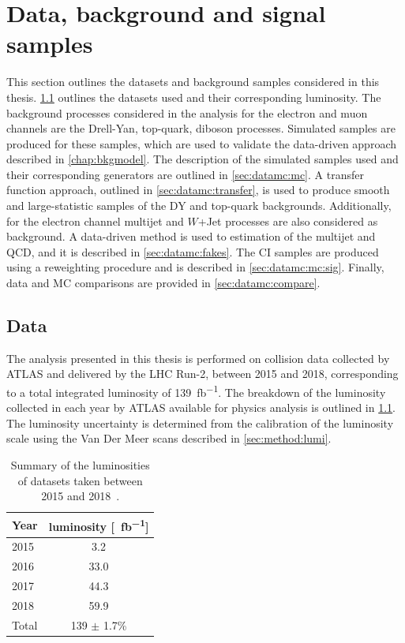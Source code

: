 \chapter{Data, background and signal samples}\label{chap:datamc}

This section outlines the datasets and background samples considered in this thesis. \cref{sec:datamc:data} outlines the datasets used and their corresponding luminosity. The background processes considered in the analysis for the electron and muon channels are the Drell-Yan, top-quark, diboson processes. Simulated samples are produced for these samples, which are used to validate the data-driven approach described in \cref{chap:bkgmodel}. The description of the simulated samples used and their corresponding generators are outlined in \cref{sec:datamc:mc}. A transfer function approach, outlined in \cref{sec:datamc:transfer}, is used to produce smooth and large-statistic samples of the DY and top-quark backgrounds. Additionally, for the electron channel multijet and $W$+Jet processes are also considered as background. A data-driven method is used to estimation of the multijet and QCD, and it is described in \cref{sec:datamc:fakes}. The CI samples are produced using a reweighting procedure and is described in \cref{sec:datamc:mc:sig}. Finally, data and MC comparisons are provided in \cref{sec:datamc:compare}.


\section{Data}\label{sec:datamc:data}
The analysis presented in this thesis is performed on \emph{\protonproton} collision data collected by ATLAS and delivered by the LHC Run-2, between 2015 and 2018, corresponding to a total integrated luminosity of \SI{139}{\femto\barn^{-1}}. The breakdown of the luminosity collected in each year by ATLAS available for physics analysis is outlined in \cref{tab:data:lumi}. The luminosity uncertainty is determined from the calibration of the luminosity scale using the Van Der Meer scans described in \cref{sec:method:lumi}. 
\begin{table}[h]
    \centering
    \begin{tabular}{l|c}
        Year & luminosity [\SI{}{\femto\barn^{-1}}] \\
        \hline
        2015 & 3.2 \\
        2016 & 33.0 \\
        2017 & 44.3 \\
        2018 & 59.9 \\
        \hline 
        \hline
        Total & 139 $\pm$ 1.7\% \\
	\end{tabular}
    \caption[Summary of the luminosities of datasets taken between 2015 and 2018]{Summary of the luminosities of datasets taken between 2015 and 2018~\cite{ATLAS:lumiPlots}.}
    \label{tab:data:lumi}
  \end{table}

